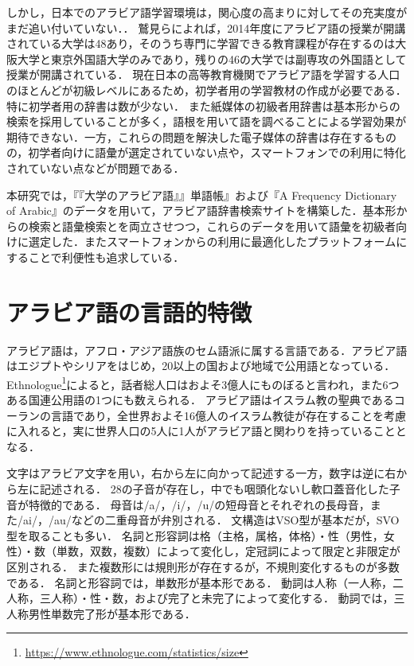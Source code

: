 \documentclass[technicalreport]{ieicej}
\begin{document}
しかし，日本でのアラビア語学習環境は，関心度の高まりに対してその充実度がまだ追い付いていない．．
鷲見\cite{washimi2016}らによれば，2014年度にアラビア語の授業が開講されている大学は48あり，そのうち専門に学習できる教育課程が存在するのは大阪大学と東京外国語大学のみであり，残りの46の大学では副専攻の外国語として授業が開講されている．
現在日本の高等教育機関でアラビア語を学習する人口のほとんどが初級レベルにあるため，初学者用の学習教材の作成が必要である．
特に初学者用の辞書は数が少ない．
また紙媒体の初級者用辞書は基本形からの検索を採用していることが多く，語根を用いて語を調べることによる学習効果が期待できない．一方，これらの問題を解決した電子媒体の辞書は存在するものの，初学者向けに語彙が選定されていない点や，スマートフォンでの利用に特化されていない点などが問題である．

本研究では，『『大学のアラビア語』』単語帳』および『A Frequency Dictionary of Arabic』のデータを用いて，アラビア語辞書検索サイトを構築した．基本形からの検索と語彙検索とを両立させつつ，これらのデータを用いて語彙を初級者向けに選定した．またスマートフォンからの利用に最適化したプラットフォームにすることで利便性も追求している．

\section{アラビア語の言語的特徴}
アラビア語は，アフロ・アジア語族のセム語派に属する言語である．アラビア語はエジプトやシリアをはじめ，20以上の国および地域で公用語となっている．
Ethnologue\footnote{\url{https://www.ethnologue.com/statistics/size}}によると，話者総人口はおよそ3億人にものぼると言われ，また6つある国連公用語の1つにも数えられる．
アラビア語はイスラム教の聖典であるコーランの言語であり，全世界およそ16億人のイスラム教徒が存在することを考慮に入れると，実に世界人口の5人に1人がアラビア語と関わりを持っていることとなる．

文字はアラビア文字を用い，右から左に向かって記述する一方，数字は逆に右から左に記述される．
28の子音が存在し，中でも咽頭化ないし軟口蓋音化した子音が特徴的である．
母音は/a/，/i/，/u/の短母音とそれぞれの長母音，また/ai/，/au/などの二重母音が弁別される．
文構造はVSO型が基本だが，SVO型を取ることも多い．
名詞と形容詞は格（主格，属格，体格）・性（男性，女性）・数（単数，双数，複数）によって変化し，定冠詞によって限定と非限定が区別される．
また複数形には規則形が存在するが，不規則変化するものが多数である．
名詞と形容詞では，単数形が基本形である．
動詞は人称（一人称，二人称，三人称）・性・数，および完了と未完了によって変化する．
動詞では，三人称男性単数完了形が基本形である．
\end{document}
